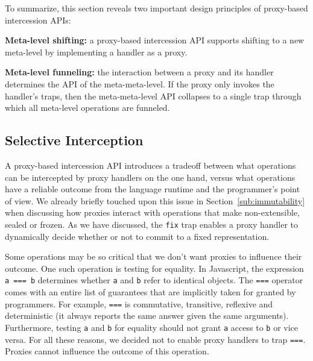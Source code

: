 \documentclass{acm_proc_article-sp}
\begin{document}
To summarize, this section reveals two important design principles of proxy-based intercession APIs:

\textbf{Meta-level shifting:} a proxy-based intercession API supports shifting to a new meta-level by implementing a handler as a proxy.

\textbf{Meta-level funneling:} the interaction between a proxy and its handler determines the API of the meta-meta-level. If the proxy only invokes the handler's traps, then the meta-meta-level API collapses to a single trap through which all meta-level operations are funneled.

\subsection{Selective Interception}

A proxy-based intercession API introduces a tradeoff between what operations can be intercepted by proxy handlers on the one hand, versus what operations have a reliable outcome from the language runtime and the programmer's point of view. We already briefly touched upon this issue in Section~\ref{sub:immutability} when discussing how proxies interact with operations that make non-extensible, sealed or frozen. As we have discussed, the \texttt{fix} trap enables a proxy handler to dynamically decide whether or not to commit to a fixed representation.

Some operations may be so critical that we don't want proxies to influence their outcome. One such operation is testing for equality. In Javascript, the expression \texttt{a === b} determines whether \texttt{a} and \texttt{b} refer to identical objects. The \texttt{===} operator comes with an entire list of guarantees that are implicitly taken for granted by programmers. For example, \texttt{===} is commutative, transitive, reflexive and deterministic (it always reports the same answer given the same arguments). Furthermore, testing \texttt{a} and \texttt{b} for equality should not grant \texttt{a} access to \texttt{b} or vice versa. For all these reasons, we decided not to enable proxy handlers to trap \texttt{===}. Proxies cannot influence the outcome of this operation.
\end{document}
